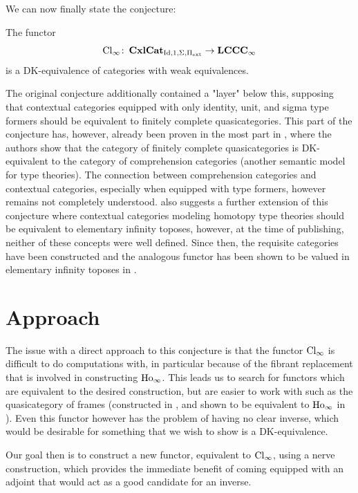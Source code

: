 \documentclass{amsart}
\begin{document}
We can now finally state the conjecture:
\begin{conj}\cite[Conj. 3.7]{KL18}
    The functor
    \[\operatorname{Cl}_\infty\colon\operatorname{\mathbf{CxlCat}}_{\operatorname{Id},1,\Sigma,\Pi_{\operatorname{ext}}}\to\operatorname{\mathbf{LCCC}}_\infty\]
    is a DK-equivalence of categories with weak equivalences.
\end{conj}

The original conjecture additionally contained a "layer" below this, supposing that contextual categories equipped with only identity, unit, and sigma type formers should be equivalent to finitely complete quasicategories. This part of the conjecture has, however, already been proven in the most part in \cite{KS17}, where the authors show that the category of finitely complete quasicategories is DK-equivalent to the category of comprehension categories (another semantic model for type theories). The connection between comprehension categories and contextual categories, especially when equipped with type formers, however remains not completely understood. \cite{KL18} also suggests a further extension of this conjecture where contextual categories modeling homotopy type theories should be equivalent to elementary infinity toposes, however, at the time of publishing, neither of these concepts were well defined. Since then, the requisite categories have been constructed and the analogous functor has been shown to be valued in elementary infinity toposes in \cite{Petrowitsch}.

\section{Approach}

The issue with a direct approach to this conjecture is that the functor $\operatorname{Cl}_\infty$ is difficult to do computations with, in particular because of the fibrant replacement that is involved in constructing $\operatorname{Ho}_\infty$. This leads us to search for functors which are equivalent to the desired construction, but are easier to work with such as the quasicategory of frames (constructed in \cite{Szumilo}, and shown to be equivalent to $\operatorname{Ho}_\infty$ in \cite{KS15}). Even this functor however has the problem of having no clear inverse, which would be desirable for something that we wish to show is a DK-equivalence.

Our goal then is to construct a new functor, equivalent to $\operatorname{Cl}_\infty$, using a nerve construction, which provides the immediate benefit of coming equipped with an adjoint that would act as a good candidate for an inverse.
\end{document}
